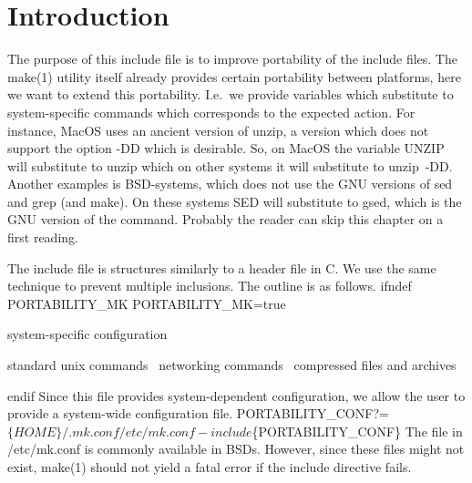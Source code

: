 \label{portability.mk}%
\section{Introduction}

The purpose of this include file is to improve portability of the include 
files.
The make(1) utility itself already provides certain portability between 
platforms, here we want to extend this portability.
I.e.\ we provide variables which substitute to system-specific commands which 
corresponds to the expected action.
For instance, MacOS uses an ancient version of {\Tt{}unzip\nwendquote}, a version which does 
not support the option {\Tt{}-DD\nwendquote} which is desirable.
So, on MacOS the variable {\Tt{}UNZIP\nwendquote} will substitute to {\Tt{}unzip\nwendquote} which on other
systems it will substitute to {\Tt{}unzip\ -DD\nwendquote}.
Another examples is BSD-systems, which does not use the GNU versions of {\Tt{}sed\nwendquote}
and {\Tt{}grep\nwendquote} (and {\Tt{}make\nwendquote}).
On these systems {\Tt{}SED\nwendquote} will substitute to {\Tt{}gsed\nwendquote}, which is the GNU version 
of the command.
Probably the reader can skip this chapter on a first reading.

The include file is structures similarly to a header file in C.
We use the same technique to prevent multiple inclusions.
The outline is as follows.
\endmoddef\nwstartdeflinemarkup\nwenddeflinemarkup
ifndef PORTABILITY_MK
PORTABILITY_MK=true

\LA{}system-specific configuration~{\nwtagstyle{}}\RA{}

\LA{}standard unix commands~{\nwtagstyle{}}\RA{}
\LA{}networking commands~{\nwtagstyle{}}\RA{}
\LA{}compressed files and archives~{\nwtagstyle{}}\RA{}

endif
\nwendcode{}Since this file provides system-dependent configuration, we allow the user to
provide a system-wide configuration file.
\nwenddocs{}\endmoddef\nwstartdeflinemarkup{}\nwenddeflinemarkup
PORTABILITY_CONF?=  $\{HOME\}/.mk.conf /etc/mk.conf
-include $\{PORTABILITY_CONF\}
\nwendcode{}The file in {\Tt{}/etc/mk.conf\nwendquote} is commonly available in BSDs.
However, since these files might not exist, make(1) should not yield a fatal 
error if the include directive fails.


